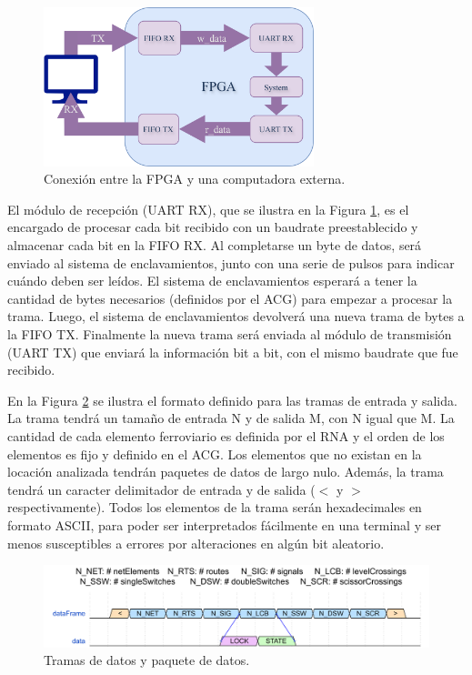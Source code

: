 	\begin{figure}[H]
		\centering
		\includegraphics[width=0.7\textwidth]{Figuras/UART_module.png}
		\centering\caption{Conexión entre la FPGA y una computadora externa.}
		\label{fig:GeneralCom}
	\end{figure}
	
	El módulo de recepción (UART RX), que se ilustra en la Figura \ref{fig:GeneralCom}, es el encargado de procesar cada bit recibido con un baudrate preestablecido y almacenar cada bit en la FIFO RX. Al completarse un byte de datos, será enviado al sistema de enclavamientos, junto con una serie de pulsos para indicar cuándo deben ser leídos. El sistema de enclavamientos esperará a tener la cantidad de bytes necesarios (definidos por el ACG) para empezar a procesar la trama. Luego, el sistema de enclavamientos devolverá una nueva trama de bytes a la FIFO TX. Finalmente la nueva trama será enviada al módulo de transmisión (UART TX) que enviará la información bit a bit, con el mismo baudrate que fue recibido.
		
	En la Figura \ref{fig:Stream} se ilustra el formato definido para las tramas de entrada y salida. La trama tendrá un tamaño de entrada N y de salida M, con N igual que M. La cantidad de cada elemento ferroviario es definida por el RNA y el orden de los elementos es fijo y definido en el ACG. Los elementos que no existan en la locación analizada tendrán paquetes de datos de largo nulo. Además, la trama tendrá un caracter delimitador de entrada y de salida ($<$ y $>$ respectivamente). Todos los elementos de la trama serán hexadecimales en formato ASCII, para poder ser interpretados fácilmente en una terminal y ser menos susceptibles a errores por alteraciones en algún bit aleatorio.
	
	\begin{figure}[H]
		\centering
		\includegraphics[width=1\textwidth]{Figuras/Tramas.png}
		\centering\caption{Tramas de datos y paquete de datos.}
		\label{fig:Stream}
	\end{figure}
	
